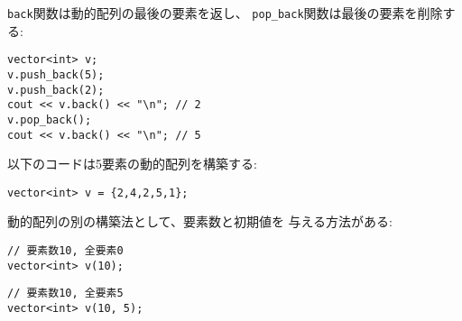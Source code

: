\begin{comment}
The function \texttt{back} returns the last element
in the vector, and
the function \texttt{pop\_back} removes the last element:
\end{comment}

\texttt{back}関数は動的配列の最後の要素を返し、
\texttt{pop\_back}関数は最後の要素を削除する:

\begin{lstlisting}
vector<int> v;
v.push_back(5);
v.push_back(2);
cout << v.back() << "\n"; // 2
v.pop_back();
cout << v.back() << "\n"; // 5
\end{lstlisting}

\begin{comment}
The following code creates a vector with five elements:
\end{comment}

以下のコードは5要素の動的配列を構築する:

\begin{lstlisting}
vector<int> v = {2,4,2,5,1};
\end{lstlisting}

\begin{comment}
Another way to create a vector is to give the number
of elements and the initial value for each element:

\begin{lstlisting}
// size 10, initial value 0
vector<int> v(10);
\end{lstlisting}
\begin{lstlisting}
// size 10, initial value 5
vector<int> v(10, 5);
\end{lstlisting}
\end{comment}

動的配列の別の構築法として、要素数と初期値を
与える方法がある:

\begin{lstlisting}
// 要素数10, 全要素0
vector<int> v(10);
\end{lstlisting}
\begin{lstlisting}
// 要素数10, 全要素5
vector<int> v(10, 5);
\end{lstlisting}

\begin{comment}
The internal implementation of a vector
uses an ordinary array.
If the size of the vector increases and
the array becomes too small,
a new array is allocated and all the
elements are moved to the new array.
However, this does not happen often and the
average time complexity of
\texttt{push\_back} is $O(1)$.
\end{comment}

